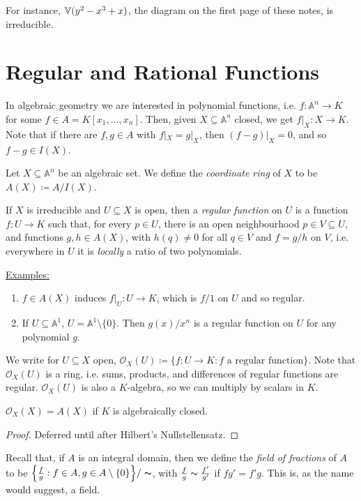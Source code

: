 \documentclass[10pt,a4paper,rgb]{article}
\begin{document}
For instance, $\mathbb{V}(y^2-x^3+x)$, the diagram on the first page of these notes, is irreducible.

\section{Regular and Rational Functions}
In algebraic geometry we are interested in polynomial functions, i.e. $f: \mathbb{A}^n \to K$ for some $f \in A = K[x_1, \ldots, x_n]$. Then, given $X \subseteq \mathbb{A}^n$ closed, we get $f|_X : X \to K$. Note that if there are $f,g \in A$ with $f|_X = g|_X$, then $(f-g)|_X = 0$, and so $f-g \in I(X)$.

Let $X \subseteq \mathbb{A}^n$ be an algebraic set. We define the \emph{coordinate ring} of $X$ to be $A(X) \coloneqq A/I(X)$.

If $X$ is irreducible and $U \subseteq X$ is open, then a \emph{regular function} on $U$ is a function $f:U \to K$ such that, for every $p \in U$, there is an open neighbourhood $p \in V \subseteq U$, and functions $g, h \in A(X)$, with $h(q) \neq 0$ for all $q \in V$ and $f = g/h$ on $V$, i.e. everywhere in $U$ it is \textit{locally} a ratio of two polynomials.

\hspace*{-1em}\underline{Examples:}
\begin{enumerate}
\item $f \in A(X)$ induces $f|_U: U \to K$, which is $f/1$ on $U$ and so regular.
\item If $U \subseteq \mathbb{A}^1$, $U = \mathbb{A}^1 \setminus\{0\}$. Then $g(x)/x^n$ is a regular function on $U$ for any polynomial $g$.
\end{enumerate}

We write for $U \subseteq X$ open, $\mathcal{O}_X(U) \coloneqq \{f:U \to K: f\text{ a regular function}\}$. Note that $\mathcal{O}_X(U)$ is a ring, i.e. sums, products, and differences of regular functions are regular. $\mathcal{O}_X(U)$ is also a $K$-algebra, so we can multiply by scalars in $K$.

\begin{lemma}
$\mathcal{O}_X(X) = A(X)$ if $K$ is algebraically closed.
\end{lemma}
\begin{proof}
Deferred until after Hilbert's Nullstellensatz.
\end{proof}

Recall that, if $A$ is an integral domain, then we define the \emph{field of fractions} of $A$ to be $\Big\{\frac{f}{g} : f \in A, g \in A \setminus\{0\}\Big\}/\thicksim$, with $\frac{f}{g} \thicksim \frac{f'}{g'}$ if $fg' = f'g$. This is, as the name would suggest, a field.
\end{document}
